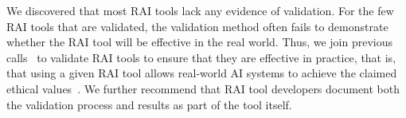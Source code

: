We discovered that most RAI tools lack any evidence of validation. For the few RAI tools that are validated, the validation method often fails to demonstrate whether the RAI tool will be effective in the real world.
Thus, we join previous calls~\cite{berman2024scoping} to validate RAI tools to ensure that they are effective in practice, that is, that using a given RAI tool allows real-world AI systems to achieve the claimed ethical values~\cite{cartwright2009thing}. 
We further recommend that RAI tool developers document both the validation process and results as part of the tool itself.

